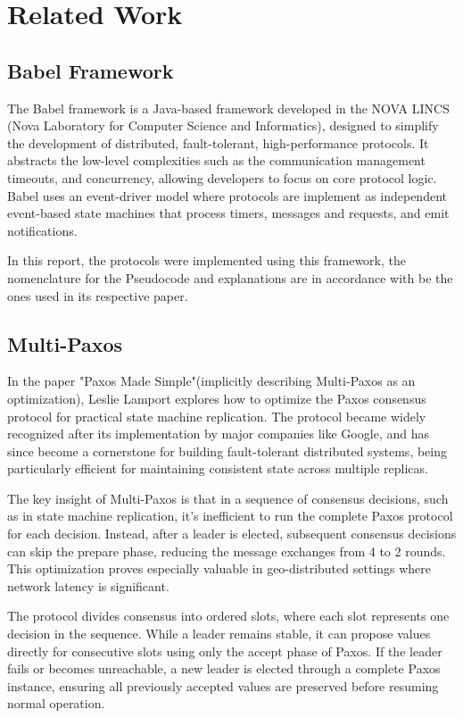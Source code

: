 \documentclass[10pt,a4paper,twocolumn]{article}
\begin{document}
\section{Related Work}
\subsection{Babel Framework}
\label{sec:BabelFramework}
The Babel framework is a Java-based framework developed in the NOVA LINCS (Nova Laboratory for Computer Science and Informatics)\cite{novaLincs}, designed to simplify the development of distributed, fault-tolerant, high-performance protocols. It abstracts the low-level complexities such as the communication management timeouts, and concurrency, allowing developers to focus on core protocol logic. Babel uses an event-driver model where protocols are implement as independent event-based state machines that process timers, messages and requests, and emit notifications.
\par In this report, the protocols were implemented using this framework, the nomenclature for the Pseudocode and explanations are in accordance with be the ones used in its respective paper.

\subsection{Multi-Paxos}
\label{sec:MultiPaxos}
In the paper "Paxos Made Simple"\cite{Lamport2001PaxosMS}(implicitly describing Multi-Paxos as an optimization), Leslie Lamport explores how to optimize the Paxos consensus protocol for practical state machine replication. The protocol became widely recognized after its implementation by major companies like Google, and has since become a cornerstone for building fault-tolerant distributed systems, being particularly efficient for maintaining consistent state across multiple replicas.

The key insight of Multi-Paxos is that in a sequence of consensus decisions, such as in state machine replication, it's inefficient to run the complete Paxos protocol for each decision. Instead, after a leader is elected, subsequent consensus decisions can skip the prepare phase, reducing the message exchanges from 4 to 2 rounds. This optimization proves especially valuable in geo-distributed settings where network latency is significant.

The protocol divides consensus into ordered slots, where each slot represents one decision in the sequence. While a leader remains stable, it can propose values directly for consecutive slots using only the accept phase of Paxos. If the leader fails or becomes unreachable, a new leader is elected through a complete Paxos instance, ensuring all previously accepted values are preserved before resuming normal operation.
\end{document}
